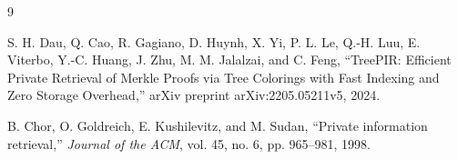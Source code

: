 \documentclass[UTF8]{ctexart}
\begin{document}
	\begin{thebibliography}{9}
		
		S. H. Dau, Q. Cao, R. Gagiano, D. Huynh, X. Yi, P. L. Le, Q.-H. Luu, E. Viterbo, Y.-C. Huang, J. Zhu, M. M. Jalalzai, and C. Feng,
		\newblock ``TreePIR: Efficient Private Retrieval of Merkle Proofs via Tree Colorings with Fast Indexing and Zero Storage Overhead,''
		\newblock arXiv preprint arXiv:2205.05211v5, 2024.
		
		B. Chor, O. Goldreich, E. Kushilevitz, and M. Sudan,
		\newblock ``Private information retrieval,''
		\newblock \emph{Journal of the ACM}, vol. 45, no. 6, pp. 965--981, 1998.
		
	\end{thebibliography}
	
\end{document}
